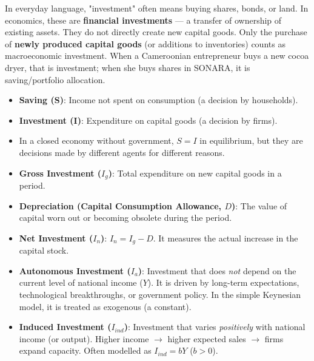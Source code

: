 \documentclass[11pt]{article}
\newcounter{popsec}
\newcounter{popsub}
\newcommand{\courssub}[1]{%
  \stepcounter{popsub}%
  \par\vspace{9pt}\noindent{\popxbold\fontsize{11.5}{13}\selectfont\color{popink}{\color{poporange}\thepopsec.\thepopsub}\hspace{6pt}#1}\par\nopagebreak\vspace{4pt}
}
\begin{document}
\begin{attention}
In everyday language, "investment" often means buying shares, bonds, or land. In economics, these are \textbf{financial investments} — a transfer of ownership of existing assets. They do not directly create new capital goods. Only the purchase of \textbf{newly produced capital goods} (or additions to inventories) counts as macroeconomic investment. When a Cameroonian entrepreneur buys a new cocoa dryer, that is investment; when she buys shares in SONARA, it is saving/portfolio allocation.
\end{attention}

\begin{aretenir}
\begin{itemize}
    \item \textbf{Saving (S)}: Income not spent on consumption (a decision by households).
    \item \textbf{Investment (I)}: Expenditure on capital goods (a decision by firms).
    \item In a closed economy without government, $S = I$ in equilibrium, but they are decisions made by different agents for different reasons.
\end{itemize}
\end{aretenir}

\courssub{Types of investment}

\begin{definition}
\begin{itemize}
    \item \textbf{Gross Investment ($I_g$)}: Total expenditure on new capital goods in a period.
    \item \textbf{Depreciation (Capital Consumption Allowance, $D$)}: The value of capital worn out or becoming obsolete during the period.
    \item \textbf{Net Investment ($I_n$)}: $I_n = I_g - D$. It measures the actual increase in the capital stock.
\end{itemize}
\end{definition}

\begin{definition}
\begin{itemize}
    \item \textbf{Autonomous Investment ($I_a$)}: Investment that does \emph{not} depend on the current level of national income ($Y$). It is driven by long-term expectations, technological breakthroughs, or government policy. In the simple Keynesian model, it is treated as exogenous (a constant).
    \item \textbf{Induced Investment ($I_{ind}$)}: Investment that varies \emph{positively} with national income (or output). Higher income $\rightarrow$ higher expected sales $\rightarrow$ firms expand capacity. Often modelled as $I_{ind} = bY$ ($b>0$).
\end{itemize}
\end{definition}
\end{document}
